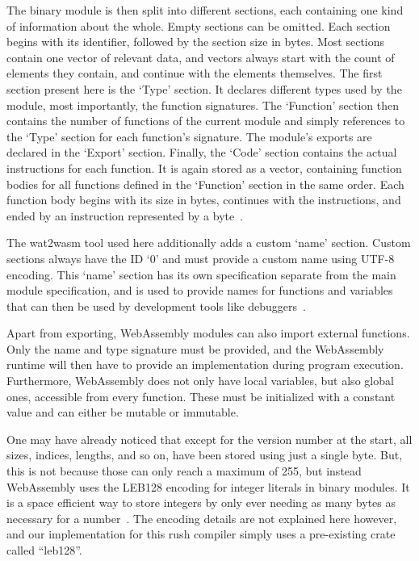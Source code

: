 The binary module is then split into different sections, each containing one kind of information about the whole.
Empty sections can be omitted.
Each section begins with its identifier, followed by the section size in bytes.
Most sections contain one vector of relevant data, and vectors always start with the count of elements they contain, and continue with the elements themselves.
The first section present here is the `Type' section.
It declares different types used by the module, most importantly, the function signatures.
The `Function' section then contains the number of functions of the current module and simply references to the `Type' section for each function's signature.
The module's exports are declared in the `Export' section.
Finally, the `Code' section contains the actual instructions for each function.
It is again stored as a vector, containing function bodies for all functions defined in the `Function' section in the same order.
Each function body begins with its size in bytes, continues with the instructions, and ended by an  instruction represented by a  byte~\cite[Sections~5.5,5.1.3,5.4.9]{WasmSpec}.

The wat2wasm tool used here additionally adds a custom `name' section.
Custom sections always have the ID `0' and must provide a custom name using UTF-8 encoding.
This `name' section has its own specification separate from the main module specification, and is used to provide names for functions and variables that can then be used by development tools like debuggers~\cite[Section~7.4.1]{WasmSpec}.

Apart from exporting, WebAssembly modules can also import external functions.
Only the name and type signature must be provided, and the WebAssembly runtime will then have to provide an implementation during program execution.
Furthermore, WebAssembly does not only have local variables, but also global ones, accessible from every function.
These must be initialized with a constant value and can either be mutable or immutable.

One may have already noticed that except for the version number at the start, all sizes, indices, lengths, and so on, have been stored using just a single byte.
But, this is not because those can only reach a maximum of 255, but instead WebAssembly uses the LEB128 encoding for integer literals in binary modules.
It is a space efficient way to store integers by only ever needing as many bytes as necessary for a number~\cite[Section~5.2.2]{WasmSpec}.
The encoding details are not explained here however, and our implementation for this rush compiler simply uses a pre-existing crate called \enquote{leb128}.

